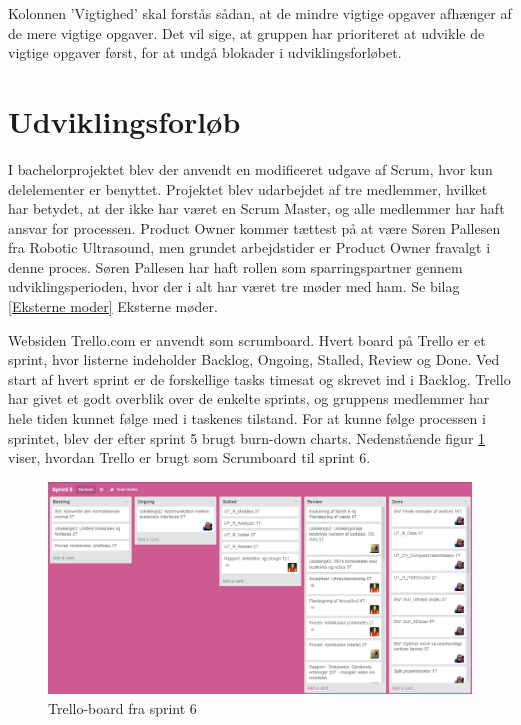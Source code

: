 Kolonnen 'Vigtighed' skal forstås sådan, at de mindre vigtige opgaver afhænger af de mere vigtige opgaver. 
Det vil sige, at gruppen har prioriteret at udvikle de vigtige opgaver først, for at undgå blokader i udviklingsforløbet.


\section{Udviklingsforløb} \label{Udviklingsforlob}

I bachelorprojektet blev der anvendt en modificeret udgave af Scrum, hvor kun delelementer er benyttet. Projektet blev udarbejdet af tre medlemmer, hvilket har betydet, at der ikke har været en Scrum Master, og alle medlemmer har haft ansvar for processen. Product Owner kommer tættest på at være Søren Pallesen fra Robotic Ultrasound, men grundet arbejdstider er Product Owner fravalgt i denne proces. Søren Pallesen har haft rollen som sparringspartner gennem udviklingsperioden, hvor der i alt har været tre møder med ham. Se bilag \ref{Eksterne moder} Eksterne møder. 

Websiden Trello.com er anvendt som scrumboard. Hvert board på Trello er et sprint, hvor listerne indeholder Backlog, Ongoing, Stalled, Review og Done. Ved start af hvert sprint er de forskellige tasks timesat og skrevet ind i Backlog. Trello har givet et godt overblik over de enkelte sprints, og gruppens medlemmer har hele tiden kunnet følge med i taskenes tilstand. For at kunne følge processen i sprintet, blev der efter sprint 5 brugt burn-down charts. 
\newpage
Nedenstående figur \ref{Trello} viser, hvordan Trello er brugt som Scrumboard til sprint 6. 

\begin{figure}[H]
    \centering
    \includegraphics[width=1\textwidth]{figurer/d/Trello}
    \caption{Trello-board fra sprint 6}
    \label{Trello}
\end{figure}

